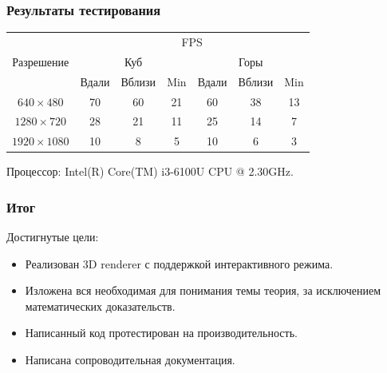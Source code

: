 \documentclass{beamer}
\begin{document}
\begin{frame}
\frametitle{Результаты тестирования}

\begin{center}
	\begin{tabular}{|c|c|c|c|c|c|c|} \hline
		\multirow{3}{*}{Разрешение}
		& \multicolumn{6}{|c|}{FPS} \\ \cline{2-7}
		& \multicolumn{3}{|c|}{Куб} & \multicolumn{3}{|c|}{Горы} \\ \cline{2-7}
		& Вдали & Вблизи & Min & Вдали & Вблизи & Min \\ \hline
		$640 \times 480$ & 70 & 60 & 21 & 60 & 38 & 13 \\ \hline
		$1280 \times 720$ & 28 & 21 & 11 & 25 & 14 & 7 \\ \hline
		$1920 \times 1080$ & 10 & 8 & 5 & 10 & 6 & 3 \\ \hline
	\end{tabular}
\end{center}

Процессор: Intel(R) Core(TM) i3-6100U CPU @ 2.30GHz.

\end{frame}

\begin{frame}
\frametitle{Итог}

Достигнутые цели:
\begin{itemize}
	\item Реализован 3D renderer с поддержкой интерактивного режима. \pause
	\item Изложена вся необходимая для понимания темы теория, за исключением математических доказательств. \pause
	\item Написанный код протестирован на производительность. \pause
	\item Написана сопроводительная документация.
\end{itemize}
\end{frame}
\end{document}

